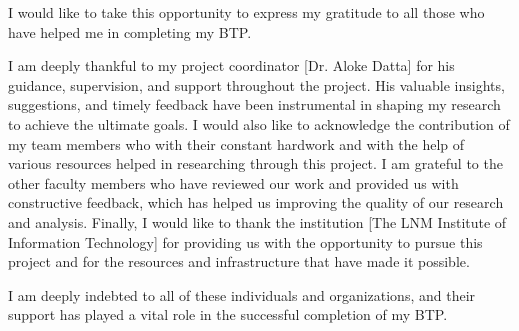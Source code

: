 \thispagestyle{plain}
% 
I would like to take this opportunity to express my gratitude to all those who have helped me in completing my BTP.

I am deeply thankful to my project coordinator [Dr. Aloke Datta] for his guidance, supervision, and support throughout the project. His valuable insights, suggestions, and timely feedback have been instrumental in shaping my research to achieve the ultimate goals.
I would also like to acknowledge the contribution of my team members who with their constant hardwork and with the help of various resources helped in researching through this project.
I am grateful to the other faculty members who have reviewed our work and provided us with constructive feedback, which has helped us improving the quality of our research and analysis.
Finally, I would like to thank the institution [The LNM Institute of Information Technology] for providing us with the opportunity to pursue this project and for the resources and infrastructure that have made it possible.

I am deeply indebted to all of these individuals and organizations, and their support has played a vital role in the successful completion of my BTP.


% 



